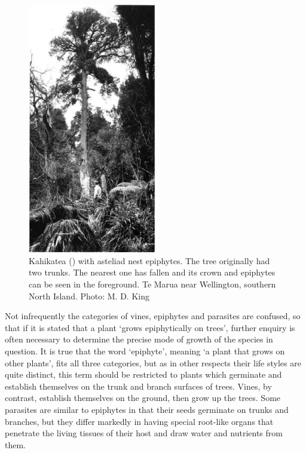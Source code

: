 \begin{figure}
	\includegraphics[width=0.5\textwidth]{graphics/figure26kahikatea.jpg}
	\centering
	\caption[Kahikatea with asteliad nest epiphytes]{Kahikatea () with asteliad nest epiphytes.
	The tree originally had two trunks.
	The nearest one has fallen and its crown and epiphytes can be seen in the foreground.
	Te Marua near Wellington, southern North Island.
	Photo: M. D. King}%
	\label{fig:26kahikatea}
\end{figure}

Not infrequently the categories of vines, epiphytes and parasites are confused, so that if it is stated that a plant `grows epiphytically on trees', further enquiry is often necessary to determine the precise mode of growth of the species in question.
It is true that the word `epiphyte', meaning `a plant that grows on other plants', fits all three categories, but as in other respects their life styles are quite distinct, this term should be restricted to plants which germinate and establish themselves on the trunk and branch surfaces of trees.
Vines, by contrast, establish themselves on the ground, then grow up the trees.
Some parasites are similar to epiphytes in that their seeds germinate on trunks and branches, but they differ markedly in having special root-like organs that penetrate the living tissues of their host and draw water and nutrients from them.

